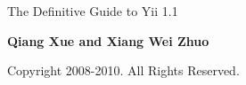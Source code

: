 
\thispagestyle{empty}
\begin{center}
    \bfseries \rule{0cm}{1.5cm} \Huge
    The Definitive Guide to Yii 1.1
     \vspace{1.5cm}
\end{center}

\begin{center}
    \bfseries \Large Qiang Xue and Xiang Wei Zhuo
\end{center}


\begin{center}
   Copyright 2008-2010. All Rights Reserved.
\end{center}

\vfill

\pagebreak \thispagestyle{empty} \cleardoublepage

